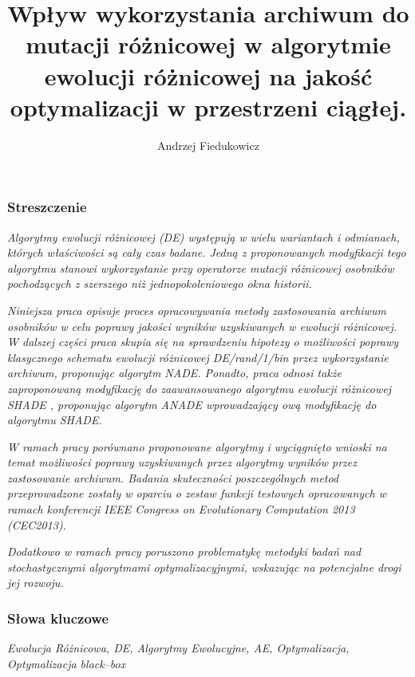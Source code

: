 \documentclass[12pt,a4paper]{report}
\title{\textbf{Wpływ wykorzystania archiwum do mutacji różnicowej w algorytmie ewolucji różnicowej na jakość optymalizacji w przestrzeni ciągłej.}}
\author{Andrzej Fiedukowicz}
\date{}
\begin{document}

\maketitle
\tableofcontents


\newpage
\subsubsection{Streszczenie}
\par{
\emph{
Algorytmy ewolucji różnicowej (DE) występują w wielu wariantach i odmianach, których właściwości są cały czas badane. Jedną z proponowanych modyfikacji tego algorytmu stanowi wykorzystanie przy operatorze mutacji różnicowej osobników pochodzących z szerszego niż jednopokoleniowego okna historii.
}
}
\par{
\emph{
Niniejsza praca opisuje proces opracowywania metody zastosowania archiwum osobników w celu poprawy jakości wyników uzyskiwanych w ewolucji różnicowej. W dalszej części praca skupia się na sprawdzeniu hipotezy o możliwości poprawy klasycznego schematu ewolucji różnicowej \emph{DE/rand/1/bin} przez wykorzystanie archiwum, proponując algorytm \emph{NADE}.
Ponadto, praca odnosi także zaproponowaną modyfikację do zaawansowanego algorytmu ewolucji różnicowej \emph{SHADE} \cite{SHADE}, proponując algorytm \emph{ANADE} wprowadzający ową modyfikację do algorytmu \emph{SHADE}.
}
}
\par{
\emph{
W ramach pracy porównano proponowane algorytmy i wyciągnięto wnioski na temat możliwości poprawy uzyskiwanych przez algorytmy wyników przez zastosowanie archiwum. Badania skuteczności poszczególnych metod przeprowadzone zostały w oparciu o zestaw funkcji testowych opracowanych w ramach konferencji \emph{IEEE Congress on Evolutionary Computation 2013 (CEC2013)}.
}
}
\par{
\emph{
Dodatkowo w ramach pracy poruszono problematykę metodyki badań nad stochastycznymi algorytmami optymalizacyjnymi, wskazując na potencjalne drogi jej rozwoju.
}
}
\subsubsection{Słowa kluczowe}
\par{
\emph{Ewolucja Różnicowa, DE, Algorytmy Ewolucyjne, AE, Optymalizacja, Optymalizacja black--box}
}
\end{document}
